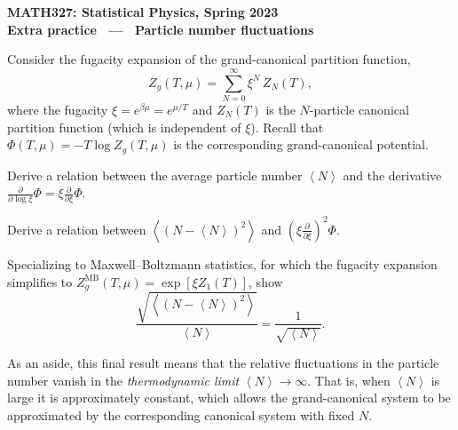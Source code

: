 \documentclass[12 pt]{article} %
\newcommand{\be}{\ensuremath{\beta} }
\newcommand{\vev}[1]{\ensuremath{\left\langle #1 \right\rangle} }
\newcommand{\pderiv}[2]{\ensuremath{\frac{\partial #1}{\partial #2}} }
\begin{document}
\newcommand{\thisunit}{MATH327 Extra (Fluctuations)}
\newcommand{\moddate}{Last modified 14 Apr.~2023}
\begin{center}
  {\Large \textbf{MATH327: Statistical Physics, Spring 2023}} \\[12 pt]
  {\Large \textbf{Extra practice \ --- \ Particle number fluctuations}} \\[24 pt]
\end{center}

Consider the fugacity expansion of the grand-canonical partition function,
\begin{equation*}
  Z_g(T, \mu) = \sum_{N = 0}^{\infty} \xi^N \, Z_N(T),
\end{equation*}
where the fugacity $\xi = e^{\be \mu} = e^{\mu / T}$ and $Z_N(T)$ is the $N$-particle canonical partition function (which is independent of $\xi$).
Recall that $\Phi(T, \mu) = -T \log Z_g(T, \mu)$ is the corresponding grand-canonical potential.

Derive a relation between the average particle number $\vev{N}$ and the derivative $\displaystyle \pderiv{}{\log \xi}\Phi = \xi \pderiv{}{\xi}\Phi$.

Derive a relation between $\vev{\left(N - \vev{N}\right)^2}$ and $\displaystyle \left(\xi \pderiv{}{\xi}\right)^2 \Phi$.

Specializing to Maxwell--Boltzmann statistics, for which the fugacity expansion simplifies to $Z_g^{\text{MB}}(T, \mu) = \exp[\xi Z_1(T)]$, show
\begin{equation*}
  \frac{\sqrt{\vev{\left(N - \vev{N}\right)^2}}}{\vev{N}} = \frac{1}{\sqrt{\vev{N}}}.
\end{equation*}

As an aside, this final result means that the relative fluctuations in the particle number vanish in the \textit{thermodynamic limit} $\vev{N} \to \infty$.
That is, when $\vev{N}$ is large it is approximately constant, which allows the grand-canonical system to be approximated by the corresponding canonical system with fixed $N$.
\end{document}
